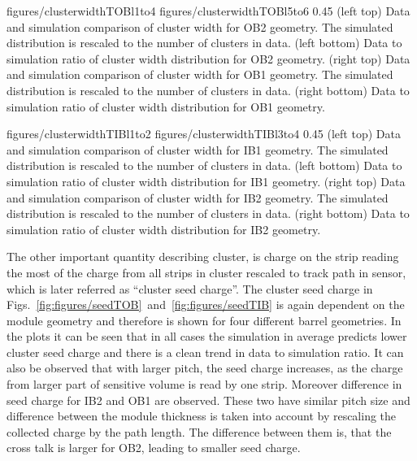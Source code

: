                  {figures/clusterwidthTOBl1to4}
                 {figures/clusterwidthTOBl5to6} %
                 {0.45}       %
                 {(left top) Data and simulation comparison of cluster width for OB2 geometry. The simulated distribution is rescaled to the number of clusters in data. (left bottom) Data to simulation ratio of cluster width distribution for OB2 geometry. (right top) Data and simulation comparison of cluster width for OB1 geometry. The simulated distribution is rescaled to the number of clusters in data. (right bottom) Data to simulation ratio of cluster width distribution for OB1 geometry. }

                 {figures/clusterwidthTIBl1to2}
                 {figures/clusterwidthTIBl3to4} %
                 {0.45}       %
                 {(left top) Data and simulation comparison of cluster width for IB1 geometry. The simulated distribution is rescaled to the number of clusters in data. (left bottom) Data to simulation ratio of cluster width distribution for IB1 geometry. (right top) Data and simulation comparison of cluster width for IB2 geometry. The simulated distribution is rescaled to the number of clusters in data. (right bottom) Data to simulation ratio of cluster width distribution for IB2 geometry. }

The other important quantity describing cluster, is charge on the strip reading the most of the charge from all strips in cluster rescaled to track path in sensor, which is later referred as ``cluster seed charge''. The cluster seed charge in Figs.~\ref{fig:figures/seedTOB}~and~\ref{fig:figures/seedTIB} is again dependent on the module geometry and therefore is shown for four different barrel geometries. In the plots it can be seen that in all cases the simulation in average predicts lower cluster seed charge and there is a clean trend in data to simulation ratio. It can also be observed that with larger pitch, the seed charge increases, as the charge from larger part of sensitive volume is read by one strip. Moreover difference in seed charge for IB2 and OB1 are observed. These two have similar pitch size and difference between the module thickness is taken into account by rescaling the collected charge by the path length. The difference between them is, that the cross talk is larger for OB2, leading to smaller seed charge.


